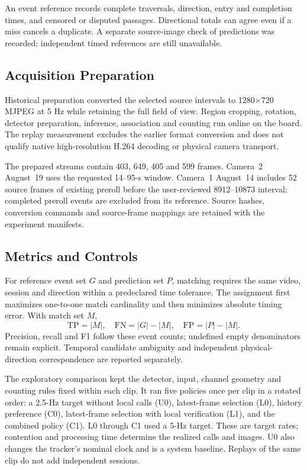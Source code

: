 \documentclass[journal]{IEEEtran}
\begin{document}
An event reference records complete traversals, direction, entry and completion times, and censored or disputed passages. Directional totals can agree even if a miss cancels a duplicate. A separate source-image check of predictions was recorded; independent timed references are still unavailable.

\subsection{Acquisition Preparation}
Historical preparation converted the selected source intervals to 1280$\times$720 MJPEG at 5 Hz while retaining the full field of view. Region cropping, rotation, detector preparation, inference, association and counting run online on the board. The replay measurement excludes the earlier format conversion and does not qualify native high-resolution H.264 decoding or physical camera transport.

The prepared streams contain 403, 649, 405 and 599 frames. Camera~2 August~19 uses the requested 14--95-s window. Camera~1 August~14 includes 52 source frames of existing preroll before the user-reviewed 8912--10873 interval; completed preroll events are excluded from its reference. Source hashes, conversion commands and source-frame mappings are retained with the experiment manifests.

\subsection{Metrics and Controls}
For reference event set $G$ and prediction set $P$, matching requires the same video, session and direction within a predeclared time tolerance. The assignment first maximizes one-to-one match cardinality and then minimizes absolute timing error. With match set $M$,
\begin{equation}
\mathrm{TP}=|M|,\quad \mathrm{FN}=|G|-|M|,\quad \mathrm{FP}=|P|-|M|.
\end{equation}
Precision, recall and F1 follow these event counts; undefined empty denominators remain explicit. Temporal candidate ambiguity and independent physical-direction correspondence are reported separately.

The exploratory comparison kept the detector, input, channel geometry and counting rules fixed within each clip. It ran five policies once per clip in a rotated order: a 2.5-Hz target without local calls (U0), latest-frame selection (L0), history preference (C0), latest-frame selection with local verification (L1), and the combined policy (C1). L0 through C1 used a 5-Hz target. These are target rates; contention and processing time determine the realized calls and images. U0 also changes the tracker's nominal clock and is a system baseline. Replays of the same clip do not add independent sessions.
\end{document}
